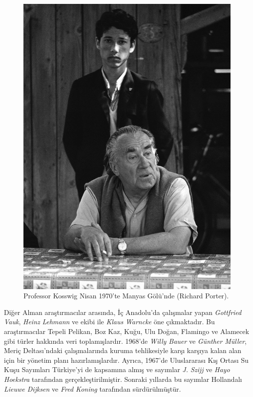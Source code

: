 \documentclass[
  a4paper,
  DIV=11,
  numbers=noendperiod]{scrreprt}
\begin{document}
\begin{figure}[H]

{\centering \includegraphics{images/Cosswig.gif}

}

\caption{Professor Kosswig Nisan 1970'te Manyas Gölü'nde (Richard
Porter).}

\end{figure}%

Diğer Alman araştırmacılar arasında, İç Anadolu'da çalışmalar yapan
\emph{Gottfried Vauk}, \emph{Heinz} \emph{Lehmann} ve ekibi ile
\emph{Klaus} \emph{Warncke} öne çıkmaktadır. Bu araştırmacılar Tepeli
Pelikan, Boz Kaz, Kuğu, Ulu Doğan, Flamingo ve Alamecek gibi türler
hakkında veri toplamışlardır. 1968'de \emph{Willy Bauer} ve
\emph{Günther Müller}, Meriç Deltası'ndaki çalışmalarında kuruma
tehlikesiyle karşı karşıya kalan alan için bir yönetim planı
hazırlamışlardır. Ayrıca, 1967'de Uluslararası Kış Ortası Su Kuşu
Sayımları Türkiye'yi de kapsamına almış ve sayımlar \emph{J. Szijj} ve
\emph{Hayo Hoekstra} tarafından gerçekleştirilmiştir. Sonraki yıllarda
bu sayımlar Hollandalı \emph{Lieuwe Dijksen} ve \emph{Fred Koning}
tarafından sürdürülmüştür.
\end{document}
